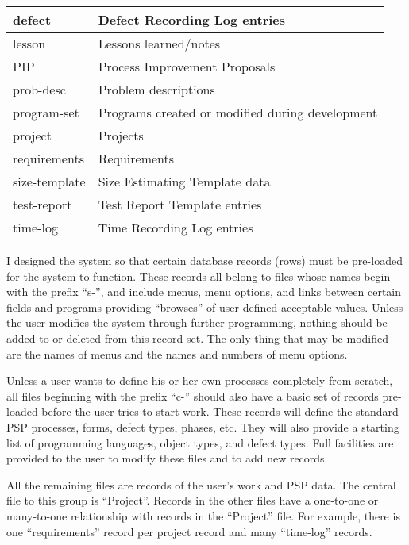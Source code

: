 \begin{table}
\begin{center}
\begin{tabular}{|l|l|}
defect         & Defect Recording Log entries                    \\ \hline
lesson         & Lessons learned/notes                           \\ \hline
PIP            & Process Improvement Proposals                   \\ \hline
prob-desc      & Problem descriptions                            \\ \hline
program-set    & Programs created or modified during development \\ \hline
project        & Projects                                        \\ \hline
requirements   & Requirements                                    \\ \hline
size-template  & Size Estimating Template data                   \\ \hline
test-report    & Test Report Template entries                    \\ \hline
time-log       & Time Recording Log entries                      \\ \hline
\end{tabular} 
\end{center} 
\end{table}

I designed the system so that certain database records (rows) must be
pre-loaded for the system to function.  These records all belong to files
whose names begin with the prefix ``s-'', and include menus, menu options,
and links between certain fields and programs providing ``browses'' of
user-defined acceptable values.  Unless the user modifies the system
through further programming, nothing should be added to or deleted from
this record set. The only thing that may be modified are the names of menus
and the names and numbers of menu options.

Unless a user wants to define his or her own processes completely from
scratch, all files beginning with the prefix ``c-'' should also have a
basic set of records pre-loaded before the user tries to start work.  These
records will define the standard PSP processes, forms, defect types,
phases, etc.  They will also provide a starting list of programming
languages, object types, and defect types. Full facilities are provided to
the user to modify these files and to add new records.

All the remaining files are records of the user's work and PSP data.  The
central file to this group is ``Project''.  Records in the other files have a
one-to-one or many-to-one relationship with records in the ``Project''
file. For example, there is one ``requirements'' record per project record
and many ``time-log'' records.

